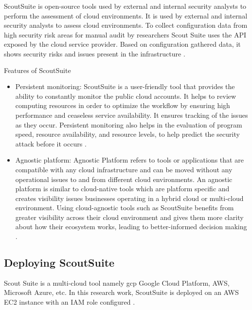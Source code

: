 \par ScoutSuite is open-source tools used by external and
internal security analysts to perform the assessment of cloud environments.
It is used by external and internal security analysts to assess cloud environments.
To collect configuration data from high security risk areas for manual audit by researchers Scout Suite uses the API exposed by the cloud service provider.
Based on configuration gathered data, it shows security
risks and issues present in the infrastructure \cite{86}
\cite{87}.
\hfill \break
\par Features of ScoutSuite
\begin{itemize}
    \item Persistent monitoring: ScoutSuite is a user-friendly tool that provides the ability to constantly monitor
    the public cloud accounts.
    It helps to review computing resources in order to optimize the workflow by ensuring high performance and ceaseless service availability.
    It ensures tracking of the issues as they occur.
    Persistent monitoring also helps in the evaluation of
    program speed, resource availability, and resource
    levels, to help predict the security attack before it occurs \cite{88}.
\end{itemize}
\begin{itemize}
    \item Agnostic platform: Agnostic Platform refers to tools or applications that are compatible with any cloud
    infrastructure and can be moved without any operational issues to and from different cloud environments.
    An agnostic platform is similar to cloud-native tools which are platform specific and creates visibility issues businesses operating in a hybrid cloud or multi-cloud environment.
    Using cloud-agnostic tools such as ScoutSuite
    benefits from greater visibility across their cloud
    environment and gives them more clarity about how their ecosystem works, leading to better-informed decision making \cite{88}.
\end{itemize}


\hfill \break

\subsection{Deploying ScoutSuite}

\par Scout Suite is a multi-cloud tool namely \gls{gcp}
Google Cloud Platform, AWS, Microsoft Azure, etc.
In this research work, ScoutSuite is deployed on an AWS EC2 instance with an
IAM role configured \cite{87}.

